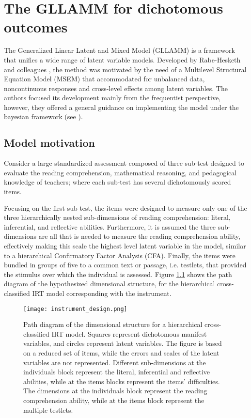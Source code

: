 \chapter{The GLLAMM for dichotomous outcomes} \label{chap:framework}

The Generalized Linear Latent and Mixed Model (GLLAMM) is a framework that unifies a wide range of latent variable models. Developed by Rabe-Hesketh and colleagues \cite{Rabe_et_al_2004a, Rabe_et_al_2004b, Rabe_et_al_2004c, Skrondal_et_al_2004a, Rabe_et_al_2012}, the method was motivated by the need of a Multilevel Structural Equation Model (MSEM) that accommodated for unbalanced data, noncontinuous responses and cross-level effects among latent variables. The authors focused its development mainly from the frequentist perspective, however, they offered a general guidance on implementing the model under the bayesian framework (see \citet{Skrondal_et_al_2004a}).


\section{Model motivation} \label{sect:motivation}

Consider a large standardized assessment composed of three sub-test designed to evaluate the reading comprehension, mathematical reasoning, and pedagogical knowledge of teachers; where each sub-test has several dichotomously scored items. 

Focusing on the first sub-test, the items were designed to measure only one of the three hierarchically nested sub-dimensions of reading comprehension: literal, inferential, and reflective abilities. Furthermore, it is assumed the three sub-dimensions are all that is needed to measure the reading comprehension ability, effectively making this scale the highest level latent variable in the model, similar to a hierarchical Confirmatory Factor Analysis (CFA). Finally, the items were bundled in groups of five to a common text or passage, i.e. testlets, that provided the stimulus over which the individual is assessed. Figure \ref{fig:design} shows the path diagram of the hypothesized dimensional structure, for the hierarchical cross-classified IRT model corresponding with the instrument.

\begin{figure}[h] \label{fig:design}
	\centering
	\texttt{[image: instrument\_design.png]}
	\caption[Path diagram of the dimensional structure for a hierarchical cross-classified IRT model.]%
	{Path diagram of the dimensional structure for a hierarchical cross-classified IRT model. Squares represent dichotomous manifest variables, and circles represent latent variables. The figure is based on a reduced set of items, while the errors and scales of the latent variables are not represented. Different sub-dimensions at the individuals block represent the literal, inferential and reflective abilities, while at the items blocks represent the items' difficulties. The dimensions at the individuals block represent the reading comprehension ability, while at the items block represent the multiple testlets.}
\end{figure}


